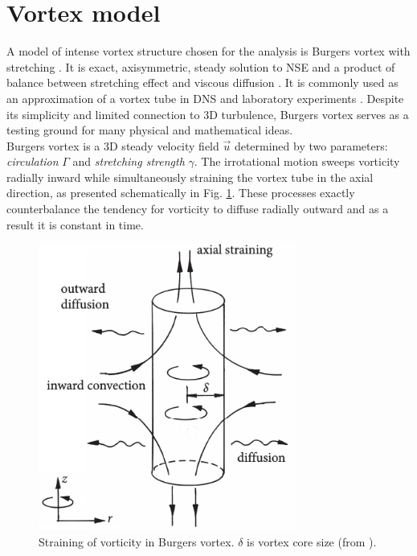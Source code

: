 \documentclass[../main.tex]{subfiles}
\begin{document}
\section{Vortex model}
\label{ch2s1}
A model of intense vortex structure chosen for the analysis is Burgers vortex with stretching \citep{Burgers1948}. It is exact, axisymmetric, steady solution to NSE and a product of balance between stretching effect and viscous diffusion \citep{Perry1987}. It is commonly used as an approximation of a vortex tube in DNS and laboratory experiments \citep{Neu1984, Jimenez1998, Bellin1999}. Despite its simplicity and limited connection to 3D turbulence, Burgers vortex serves as a testing ground for many physical and mathematical ideas.\\
Burgers vortex is a 3D steady velocity field $\vec{u}$ determined by two parameters: \emph{circulation} $\Gamma$ and \emph{stretching strength} $\gamma$. The irrotational motion sweeps vorticity radially inward while simultaneously straining the vortex tube in the axial direction, as presented schematically in Fig. \ref{fig:ch2_01a}. These processes exactly counterbalance the tendency for vorticity to diffuse radially outward and as a result it is constant in time.
\begin{figure}
\centering
\noindent \includegraphics[width=20pc]{gfx/Burg_vortex_scheme.png}
\caption{Straining of vorticity in Burgers vortex. $\delta$ is vortex core size  (from \citet{Davidson2004}).}
\label{fig:ch2_01a}
\end{figure}
\end{document}
